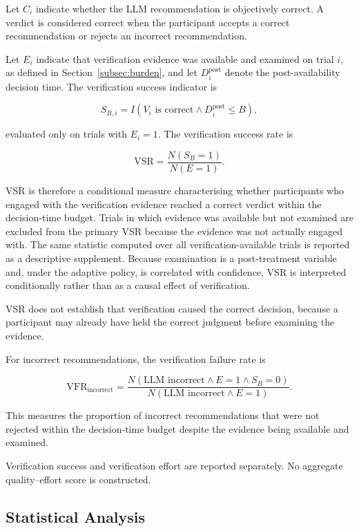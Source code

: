 \documentclass[oneside,final,14pt,a4paper]{extreport}
\begin{document}
Let $C_i$ indicate whether the LLM recommendation is objectively correct. A
verdict is considered correct when the participant accepts a correct
recommendation or rejects an incorrect recommendation.

Let $E_i$ indicate that verification evidence was available and examined on
trial $i$, as defined in Section~\ref{subsec:burden}, and let
$D_i^{\mathrm{post}}$ denote the post-availability decision time. The
verification success indicator is

$$
S_{B,i}
=
I\left(
V_i\text{ is correct}
\land
D_i^{\mathrm{post}}\leq B
\right),
$$

evaluated only on trials with $E_i=1$. The verification success rate is

$$
\text{VSR}
=
\frac{
N(S_B=1)
}{
N(E=1)
}.
$$

VSR is therefore a conditional measure characterising whether participants
who engaged with the verification evidence reached a correct verdict within
the decision-time budget. Trials in which evidence was available but not
examined are excluded from the primary VSR because the evidence was not
actually engaged with. The same statistic computed over all
verification-available trials is reported as a descriptive supplement. Because
examination is a post-treatment variable and, under the adaptive policy, is
correlated with confidence, VSR is interpreted conditionally rather than as a
causal effect of verification.

VSR does not establish that verification caused the correct decision, because
a participant may already have held the correct judgment before examining the
evidence.

For incorrect recommendations, the verification failure rate is

$$
\text{VFR}_{\mathrm{incorrect}}
=
\frac{
N(\text{LLM incorrect}\land E=1\land S_B=0)
}{
N(\text{LLM incorrect}\land E=1)
}.
$$

This measures the proportion of incorrect recommendations that were not
rejected within the decision-time budget despite the evidence being available
and examined.

Verification success and verification effort are reported separately. No
aggregate quality--effort score is constructed.

\subsection{Statistical Analysis}
\label{subsec:analysis}
\end{document}
